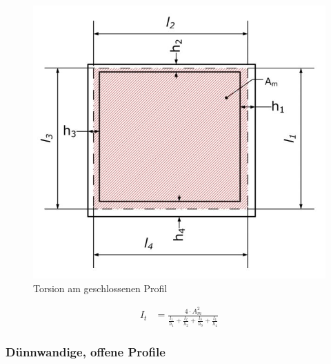\begin{figure}[h]
	\centering
	\includegraphics[scale=0.6]{Torsion_2.jpg}
	\caption{Torsion am geschlossenen Profil}
\end{figure}


\begin{align*}
I_t &= \frac{4 \cdot A_m^2}{\frac{l_1}{h_1} + \frac{l_2}{h_2} + \frac{l_3}{h_3} + \frac{l_4}{h_4}}
\end{align*}

\newpage

\subsubsection*{Dünnwandige, offene Profile}


